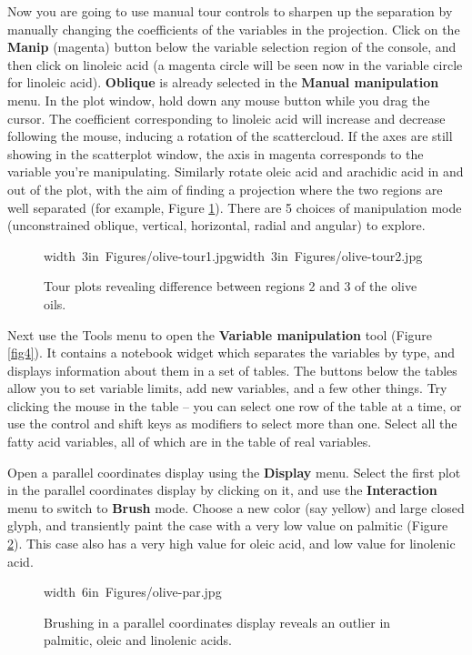 \documentclass[11pt]{article}
\def\Widget#1{\textbf{#1}}
\begin{document}
Now you are going to use manual tour controls to sharpen up the
separation by manually changing the coefficients of the variables in
the projection.  Click on the \Widget{Manip} (magenta) button below
the variable selection region of the console, and then click on
linoleic acid (a magenta circle will be seen now in the variable
circle for linoleic acid).  \Widget{Oblique} is already selected in
the \Widget{Manual manipulation} menu.  In the plot window, hold down
any mouse button while you drag the cursor. The coefficient
corresponding to linoleic acid will increase and decrease following
the mouse, inducing a rotation of the scattercloud.  If the axes are
still showing in the scatterplot window, the axis in magenta
corresponds to the variable you're manipulating.  Similarly rotate
oleic acid and arachidic acid in and out of the plot, with the aim of
finding a projection where the two regions are well separated (for
example, Figure \ref{fig6}).  There are 5 choices of manipulation mode
(unconstrained oblique, vertical, horizontal, radial and angular) to
explore.

\begin{figure}[htp]
\hbox{\pdfimage width 3in {Figures/olive-tour1.jpg}\pdfimage width 3in {Figures/olive-tour2.jpg}}
\caption{Tour plots revealing difference between regions 2 and 3 of the
olive oils.}
\label{fig6}
\end{figure}

Next use the Tools menu to open the \Widget{Variable manipulation} tool
(Figure \ref{fig4}).  It contains a notebook widget which separates
the variables by type, and displays information about them in a set
of tables.  The buttons below the tables allow you to set variable
limits, add new variables, and a few other things.  Try clicking the
mouse in the table -- you can select one row of the table at a time,
or use the control and shift keys as modifiers to select more than one.
Select all the fatty acid variables, all of which are in the table
of real variables.

Open a parallel coordinates display using the \Widget{Display} menu.
Select the first plot in the parallel coordinates display by
clicking on it, and use the \Widget{Interaction} menu to switch to 
\Widget{Brush} mode. Choose a new color (say yellow) and large closed glyph,
and transiently paint the case with a very low value on palmitic
(Figure \ref{fig7}). This case also has a very high value for oleic
acid, and low value for linolenic acid.

\begin{figure}[htp]
\hbox{\pdfimage width 6in {Figures/olive-par.jpg}}
\caption{Brushing in a parallel coordinates display reveals an outlier in 
palmitic, oleic and linolenic acids.}
\label{fig7}
\end{figure}
\end{document}
